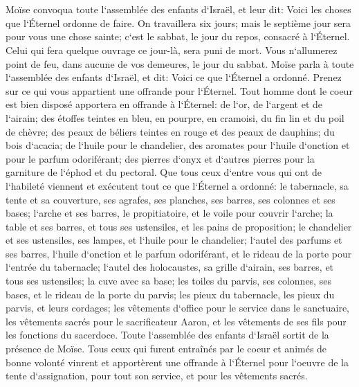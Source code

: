 \chapter{}

\verse Moïse convoqua toute l`assemblée des enfants d`Israël, et leur dit: Voici les choses que l`Éternel ordonne de faire. 
\verse On travaillera six jours; mais le septième jour sera pour vous une chose sainte; c`est le sabbat, le jour du repos, consacré à l`Éternel. Celui qui fera quelque ouvrage ce jour-là, sera puni de mort. 
\verse Vous n`allumerez point de feu, dans aucune de vos demeures, le jour du sabbat. 
\verse Moïse parla à toute l`assemblée des enfants d`Israël, et dit: Voici ce que l`Éternel a ordonné. 
\verse Prenez sur ce qui vous appartient une offrande pour l`Éternel. Tout homme dont le coeur est bien disposé apportera en offrande à l`Éternel: de l`or, de l`argent et de l`airain; 
\verse des étoffes teintes en bleu, en pourpre, en cramoisi, du fin lin et du poil de chèvre; 
\verse des peaux de béliers teintes en rouge et des peaux de dauphins; du bois d`acacia; 
\verse de l`huile pour le chandelier, des aromates pour l`huile d`onction et pour le parfum odoriférant; 
\verse des pierres d`onyx et d`autres pierres pour la garniture de l`éphod et du pectoral. 
\verse Que tous ceux d`entre vous qui ont de l`habileté viennent et exécutent tout ce que l`Éternel a ordonné: 
\verse le tabernacle, sa tente et sa couverture, ses agrafes, ses planches, ses barres, ses colonnes et ses bases; 
\verse l`arche et ses barres, le propitiatoire, et le voile pour couvrir l`arche; 
\verse la table et ses barres, et tous ses ustensiles, et les pains de proposition; 
\verse le chandelier et ses ustensiles, ses lampes, et l`huile pour le chandelier; 
\verse l`autel des parfums et ses barres, l`huile d`onction et le parfum odoriférant, et le rideau de la porte pour l`entrée du tabernacle; 
\verse l`autel des holocaustes, sa grille d`airain, ses barres, et tous ses ustensiles; la cuve avec sa base; 
\verse les toiles du parvis, ses colonnes, ses bases, et le rideau de la porte du parvis; 
\verse les pieux du tabernacle, les pieux du parvis, et leurs cordages; les vêtements d`office pour le service dans le sanctuaire, 
\verse les vêtements sacrés pour le sacrificateur Aaron, et les vêtements de ses fils pour les fonctions du sacerdoce. 
\verse Toute l`assemblée des enfants d`Israël sortit de la présence de Moïse. 
\verse Tous ceux qui furent entraînés par le coeur et animés de bonne volonté vinrent et apportèrent une offrande à l`Éternel pour l`oeuvre de la tente d`assignation, pour tout son service, et pour les vêtements sacrés. 
